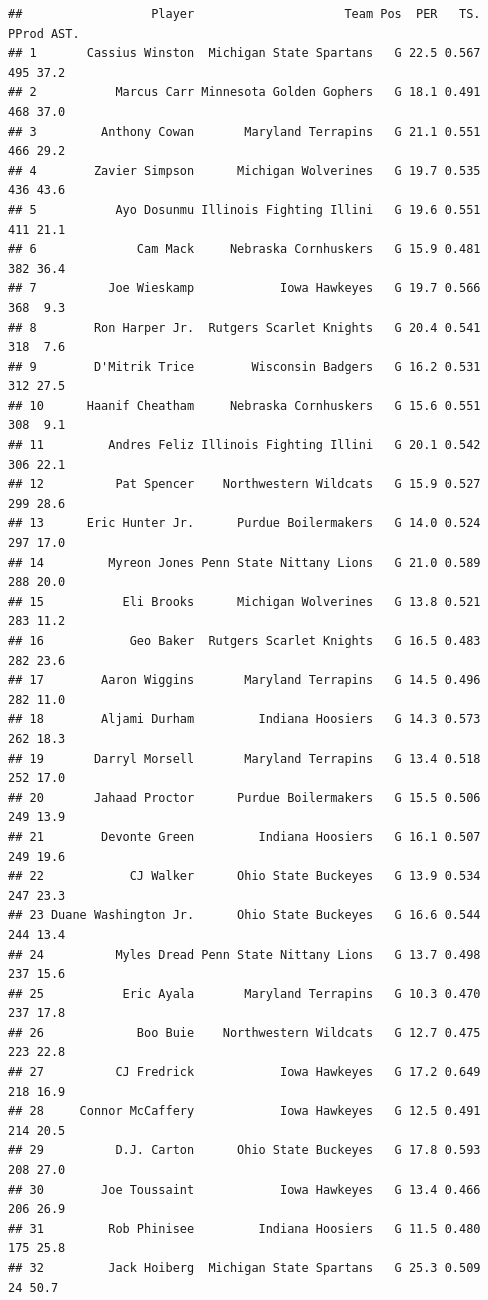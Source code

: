 \documentclass[]{book}
\begin{document}
\begin{verbatim}
##                  Player                     Team Pos  PER   TS. PProd AST.
## 1       Cassius Winston  Michigan State Spartans   G 22.5 0.567   495 37.2
## 2           Marcus Carr Minnesota Golden Gophers   G 18.1 0.491   468 37.0
## 3         Anthony Cowan       Maryland Terrapins   G 21.1 0.551   466 29.2
## 4        Zavier Simpson      Michigan Wolverines   G 19.7 0.535   436 43.6
## 5           Ayo Dosunmu Illinois Fighting Illini   G 19.6 0.551   411 21.1
## 6              Cam Mack     Nebraska Cornhuskers   G 15.9 0.481   382 36.4
## 7          Joe Wieskamp            Iowa Hawkeyes   G 19.7 0.566   368  9.3
## 8        Ron Harper Jr.  Rutgers Scarlet Knights   G 20.4 0.541   318  7.6
## 9        D'Mitrik Trice        Wisconsin Badgers   G 16.2 0.531   312 27.5
## 10      Haanif Cheatham     Nebraska Cornhuskers   G 15.6 0.551   308  9.1
## 11         Andres Feliz Illinois Fighting Illini   G 20.1 0.542   306 22.1
## 12          Pat Spencer    Northwestern Wildcats   G 15.9 0.527   299 28.6
## 13      Eric Hunter Jr.      Purdue Boilermakers   G 14.0 0.524   297 17.0
## 14         Myreon Jones Penn State Nittany Lions   G 21.0 0.589   288 20.0
## 15           Eli Brooks      Michigan Wolverines   G 13.8 0.521   283 11.2
## 16            Geo Baker  Rutgers Scarlet Knights   G 16.5 0.483   282 23.6
## 17        Aaron Wiggins       Maryland Terrapins   G 14.5 0.496   282 11.0
## 18        Aljami Durham         Indiana Hoosiers   G 14.3 0.573   262 18.3
## 19       Darryl Morsell       Maryland Terrapins   G 13.4 0.518   252 17.0
## 20       Jahaad Proctor      Purdue Boilermakers   G 15.5 0.506   249 13.9
## 21        Devonte Green         Indiana Hoosiers   G 16.1 0.507   249 19.6
## 22            CJ Walker      Ohio State Buckeyes   G 13.9 0.534   247 23.3
## 23 Duane Washington Jr.      Ohio State Buckeyes   G 16.6 0.544   244 13.4
## 24          Myles Dread Penn State Nittany Lions   G 13.7 0.498   237 15.6
## 25           Eric Ayala       Maryland Terrapins   G 10.3 0.470   237 17.8
## 26             Boo Buie    Northwestern Wildcats   G 12.7 0.475   223 22.8
## 27          CJ Fredrick            Iowa Hawkeyes   G 17.2 0.649   218 16.9
## 28     Connor McCaffery            Iowa Hawkeyes   G 12.5 0.491   214 20.5
## 29          D.J. Carton      Ohio State Buckeyes   G 17.8 0.593   208 27.0
## 30        Joe Toussaint            Iowa Hawkeyes   G 13.4 0.466   206 26.9
## 31         Rob Phinisee         Indiana Hoosiers   G 11.5 0.480   175 25.8
## 32         Jack Hoiberg  Michigan State Spartans   G 25.3 0.509    24 50.7

\end{verbatim}
\end{document}
